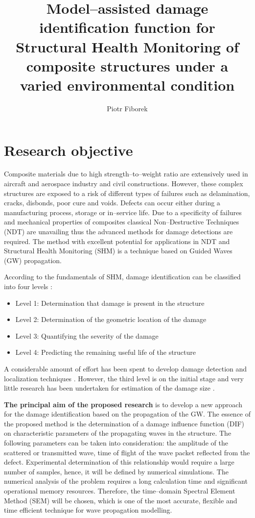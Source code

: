 \documentclass[a4paper,12pt]{article}
\author{Piotr Fiborek}
\date{}
\title{Model--assisted damage identification function for Structural Health Monitoring of composite structures under a varied environmental condition}
\begin{document}
\section{Research objective}
Composite materials due to high strength--to--weight ratio are extensively used in aircraft and aerospace industry and civil constructions. However, these complex structures are exposed to a risk of different types of failures such as delamination, cracks, disbonds, poor cure and voids. Defects can occur either during a manufacturing process, storage or in--service life. Due to a specificity of failures and mechanical properties of composites classical Non--Destructive Techniques (NDT) are unavailing thus the advanced methods for damage detections are required. The method with excellent potential for applications in NDT and Structural Health Monitoring (SHM) is a technique based on Guided Waves (GW) propagation.

According to the fundamentals of SHM, damage identification can be classified into four levels \cite{guemes2010smart}:
\begin{itemize}
	\item Level 1: Determination that damage is present in the structure
	\item Level 2: Determination of the geometric location of the damage
	\item Level 3: Quantifying the severity of the damage
	\item Level 4: Predicting the remaining useful life of the structure
\end{itemize}

A considerable amount of effort has been spent to develop damage detection and localization techniques \cite{mitra2016guided}. However, the third level is on the initial stage and very little research has been undertaken for estimation of the damage size \cite{ghrib2018automatic}.

\textbf{The principal aim of the proposed research} is to develop a new approach for the damage identification based on the propagation of the GW. The essence of the proposed method is the determination of a damage influence function (DIF) on characteristic parameters of the propagating waves in the structure. The following parameters can be taken into consideration: the amplitude of the scattered or transmitted wave, time of flight of the wave packet reflected from the defect. Experimental determination of this relationship would require a large number of samples, hence, it will be defined by numerical simulations. The numerical analysis of the problem requires a long calculation time and significant operational memory resources. Therefore, the time--domain Spectral Element Method (SEM) will be chosen, which is one of the most accurate, flexible and time efficient technique for wave propagation modelling.
\end{document}
